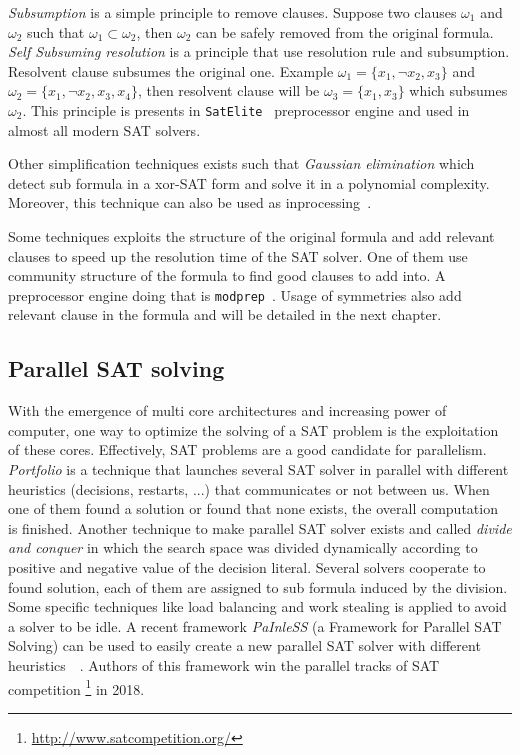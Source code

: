 \emph{Subsumption} is a simple principle to remove clauses. Suppose two clauses $\omega_1$ and $\omega_2$ such that
$\omega_1 \subset  \omega_2$, then $\omega_2$ can be safely removed from the original formula.
\emph{Self Subsuming resolution} is a principle that use resolution rule and subsumption.
Resolvent clause subsumes the original one. Example $\omega_1 = \{x_1, \neg x_2, x_3\}$ and $\omega_2 = \{x_1, \neg x_2, x_3, x_4\}$, then resolvent clause will be $\omega_3 = \{x_1, x_3\}$ which subsumes $\omega_2$. This principle
is presents in \texttt{SatElite}~\cite{een2005effective} preprocessor engine and used in almost all modern SAT solvers.

Other simplification techniques exists such that \emph{Gaussian elimination} which detect sub formula in a xor-SAT
form and solve it in a polynomial complexity. Moreover, this technique can also be used as inprocessing~\cite{soos2010enhanced}. 

Some techniques exploits the structure of the original formula and add relevant clauses to speed up the resolution
time of the SAT solver. One of them use community structure of the formula to find good clauses to add into.
A preprocessor engine doing that is  \texttt{modprep}~\cite{ansotegui2015using}.
Usage of symmetries also add relevant clause in the formula and will be detailed in the next chapter.


\subsection{Parallel SAT solving}
With the emergence of multi core architectures and increasing power of computer, one way to optimize the solving
of a SAT problem is the exploitation of these cores. Effectively, SAT problems are a good candidate for parallelism.
\emph{Portfolio} is a technique that launches several SAT solver in parallel with different heuristics (decisions, restarts, ...) that communicates or not between us. When one of them found a solution or found that none exists, the overall computation is finished. Another technique to make parallel SAT solver exists and called \emph{divide and conquer} in which the search space was divided dynamically according to positive and negative value of the decision
literal. Several solvers cooperate to found solution, each of them are assigned to sub formula induced by the division. Some specific techniques like load balancing and work stealing is applied to avoid a solver to be idle.
A recent framework \emph{PaInleSS} (a Framework for Parallel SAT Solving) can be used to easily create a new parallel 
SAT solver with different heuristics~\cite{le2017painless}~\cite{le2019modular}. Authors of this framework win the parallel tracks of SAT competition \footnote{\url{http://www.satcompetition.org/}} in 2018.






